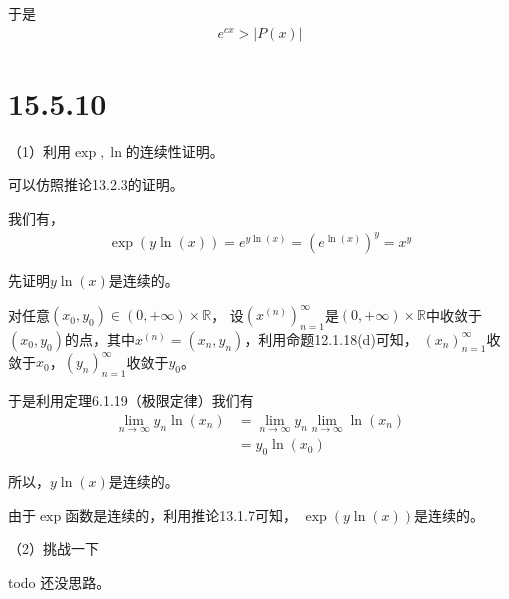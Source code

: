 \documentclass{article}
\begin{document}
于是
\begin{align*}
  e^{cx} > |P(x)|
\end{align*}

\section*{15.5.10}

（1）利用$\exp, \ln$的连续性证明。

可以仿照推论13.2.3的证明。

我们有，
\begin{align*}
  \exp(y\ln(x)) = e^{y\ln(x)} = (e^{\ln(x)})^y = x^y
\end{align*}

先证明$y\ln(x)$是连续的。

对任意$(x_0, y_0) \in (0, + \infty) \times \mathbb{R}$，
设$(x^{(n)})_{n = 1}^\infty$是$(0, + \infty) \times \mathbb{R}$中收敛于
$(x_0, y_0)$的点，其中$x^{(n)} = (x_n, y_n)$，利用命题12.1.18(d)可知，
$(x_n)_{n = 1}^\infty$收敛于$x_0$，$(y_n)_{n = 1}^\infty$收敛于$y_0$。

于是利用定理6.1.19（极限定律）我们有
\begin{align*}
  \lim\limits_{n \to \infty} y_n \ln(x_n)
   & = \lim\limits_{n \to \infty} y_n \lim\limits_{n \to \infty} \ln(x_n) \\
   & = y_0 \ln(x_0)
\end{align*}

所以，$y\ln(x)$是连续的。

由于$\exp$函数是连续的，利用推论13.1.7可知，
$\exp(y\ln(x))$是连续的。

（2）挑战一下

todo 还没思路。
\end{document}
